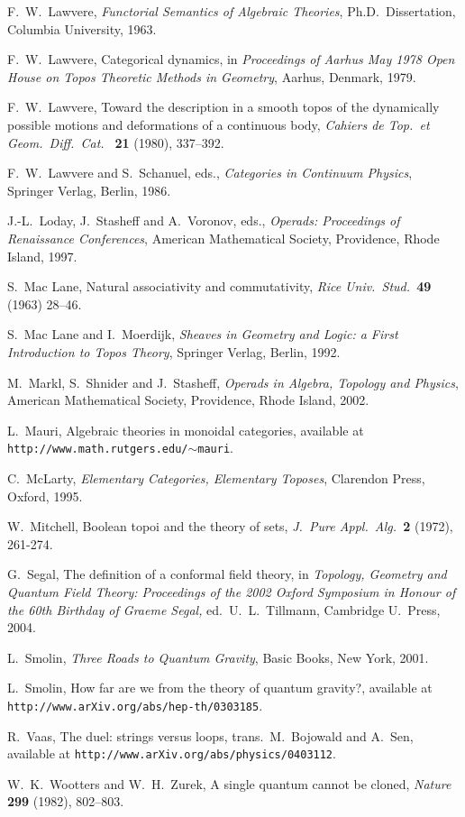 \documentclass[12pt]{article}
\begin{document}
\begin{thebibliography}{99}
 F.\ W.\ Lawvere, {\sl Functorial Semantics of 
Algebraic Theories}, Ph.D.\ Dissertation, Columbia University, 1963.

 F.\ W.\ Lawvere, Categorical dynamics, in
{\sl Proceedings of Aarhus May 1978 Open House on Topos Theoretic 
Methods in Geometry}, Aarhus, Denmark, 1979. 

F.\ W.\ Lawvere, Toward the description in a smooth topos of the 
dynamically possible motions and deformations of a continuous body, 
{\sl Cahiers de Top.\ et Geom.\ Diff.\ Cat.\ } {\bf 21} (1980), 337--392. 

  F.\ W.\ Lawvere and S.\ Schanuel, eds., 
{\sl Categories in Continuum Physics}, Springer Verlag, Berlin, 1986. 

 J.-L.\ Loday, J.\ Stasheff and A.\ Voronov, eds.,
{\sl Operads: Proceedings of Renaissance Conferences}, American
Mathematical Society, Providence, Rhode Island, 1997.

 S.\ Mac Lane, Natural associativity and 
commutativity, {\sl Rice Univ.\ Stud.\ }{\bf 49} (1963) 28--46.
 
 S.\ Mac Lane and I.\ Moerdijk, {\sl Sheaves in 
Geometry and Logic: a First Introduction to Topos Theory}, 
Springer Verlag, Berlin, 1992.

 M.\ Markl, S.\ Shnider and J.\ Stasheff,
{\sl Operads in Algebra, Topology and Physics}, American
Mathematical Society, Providence, Rhode Island, 2002.

 L.\ Mauri, Algebraic theories in monoidal categories,
available at \hfill \break \texttt{http://www.math.rutgers.edu/$\sim$mauri}.

 C.\ McLarty, {\sl Elementary Categories, 
Elementary Toposes}, Clarendon Press, Oxford, 1995.

 W.\ Mitchell, Boolean topoi and the
theory of sets, {\sl J.\ Pure Appl.\ Alg.\ }{\bf 2} (1972), 
261-274.

 G.\ Segal, The definition of a conformal field theory, 
in {\sl Topology, Geometry and Quantum Field Theory: Proceedings of the 
2002 Oxford Symposium in Honour of the 60th Birthday of Graeme Segal,} 
ed.\ U.\ L.\ Tillmann, Cambridge U.\ Press, 2004.

 L.\ Smolin, {\sl Three Roads to Quantum Gravity}, 
Basic Books, New York, 2001.

L.\ Smolin, How far are we from the theory of quantum
gravity?, available at \texttt{http://www.arXiv.org/abs/hep-th/0303185}.

 R.\ Vaas, The duel: strings versus loops, trans.\
M.\ Bojowald and A.\ Sen, available at 
\texttt{http://www.arXiv.org/abs/physics/0403112}.

 W.\ K.\ Wootters and W.\ H.\ Zurek,
A single quantum cannot be cloned, {\sl Nature} {\bf 299} 
(1982), 802--803. 

\end{thebibliography}
\end{document}
